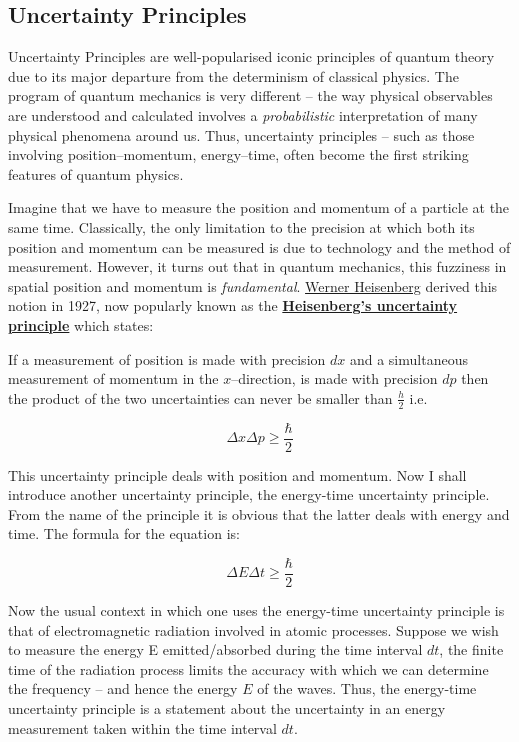  \subsection{Uncertainty Principles}
 
Uncertainty Principles are well-popularised iconic principles of quantum theory due to its major departure from the determinism of classical physics. The program of quantum mechanics is very different -- the way physical observables are understood and calculated involves a \textit{probabilistic} interpretation of many physical phenomena around us. Thus, uncertainty principles -- such as those involving position--momentum, energy--time,  often become the first striking features of quantum physics.
 
 Imagine that we have to measure the position and momentum of a particle at the same time. Classically, the only limitation to the precision at which both its position and momentum can be measured is due to technology and the method of measurement. However, it turns out that in quantum mechanics, this fuzziness in spatial position and momentum is \textit{fundamental}. \href{http://nobelprize.org/nobel_prizes/physics/laureates/1932/heisenberg-bio.html}{Werner Heisenberg} derived this notion in 1927, now popularly known as the \textbf{\href{http://scienceworld.wolfram.com/physics/UncertaintyPrinciple.html}{Heisenberg's uncertainty principle}} which states:
 
 If a measurement of position is made with precision $d x$ and a simultaneous measurement of momentum in the $x$--direction, is made with precision $d p$ then the product of the two uncertainties can never be smaller than $\frac{h}{2}$ i.e.
 
 \begin{form}
$$\Delta x \Delta p \ge \frac{\hbar}{2}$$
\end{form}

This uncertainty principle deals with position and momentum. Now I shall introduce another uncertainty principle, the energy-time uncertainty principle. From the name of the principle it is obvious that the latter deals with energy and time. The formula for the equation is:
\begin{form}
$$\Delta E \Delta t \ge \frac{\hbar}{2}$$
\end{form}

Now the usual context in which one uses the energy-time uncertainty principle is that of electromagnetic radiation involved in atomic processes. Suppose we wish to measure the energy E emitted/absorbed during the time interval $d t$, the finite time of the radiation process limits the accuracy with which we can determine the frequency -- and hence the energy $E$ of the waves. Thus, the energy-time uncertainty principle is a statement about the uncertainty in an energy measurement taken within the time interval $d t$.
